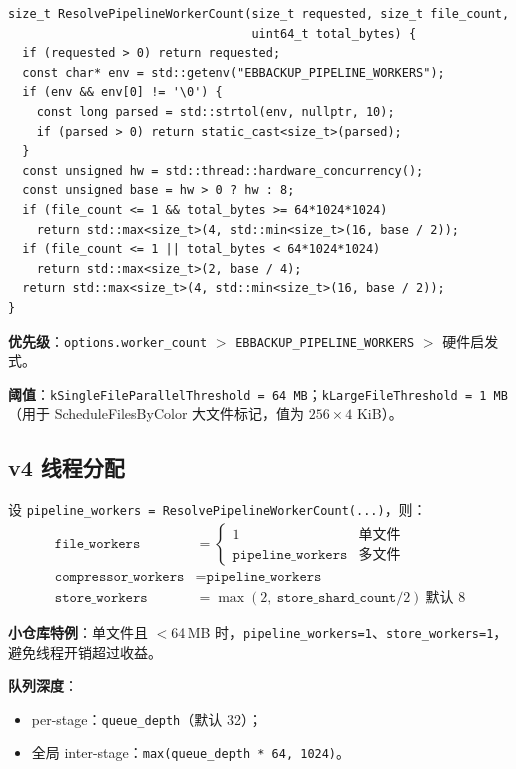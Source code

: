 \begin{lstlisting}[caption={ResolvePipelineWorkerCount 逻辑},label={lst:resolve-workers}]
size_t ResolvePipelineWorkerCount(size_t requested, size_t file_count,
                                  uint64_t total_bytes) {
  if (requested > 0) return requested;
  const char* env = std::getenv("EBBACKUP_PIPELINE_WORKERS");
  if (env && env[0] != '\0') {
    const long parsed = std::strtol(env, nullptr, 10);
    if (parsed > 0) return static_cast<size_t>(parsed);
  }
  const unsigned hw = std::thread::hardware_concurrency();
  const unsigned base = hw > 0 ? hw : 8;
  if (file_count <= 1 && total_bytes >= 64*1024*1024)
    return std::max<size_t>(4, std::min<size_t>(16, base / 2));
  if (file_count <= 1 || total_bytes < 64*1024*1024)
    return std::max<size_t>(2, base / 4);
  return std::max<size_t>(4, std::min<size_t>(16, base / 2));
}
\end{lstlisting}

\textbf{优先级}：\texttt{options.worker\_count} $>$ \texttt{EBBACKUP\_PIPELINE\_WORKERS} $>$ 硬件启发式。

\textbf{阈值}：\texttt{kSingleFileParallelThreshold = 64\,MB}；\texttt{kLargeFileThreshold = 1\,MB}（用于 ScheduleFilesByColor 大文件标记，值为 $256 \times 4$ KiB）。

\subsection{v4 线程分配}

设 \texttt{pipeline\_workers = ResolvePipelineWorkerCount(...)}，则：
\begin{align*}
\texttt{file\_workers} &= \begin{cases}
  1 & \text{单文件} \\
  \texttt{pipeline\_workers} & \text{多文件}
\end{cases} \\
\texttt{compressor\_workers} &= \texttt{pipeline\_workers} \\
\texttt{store\_workers} &= \max(2,\ \texttt{store\_shard\_count}/2)\ \text{默认 8}
\end{align*}

\textbf{小仓库特例}：单文件且 $<$64\,MB 时，\texttt{pipeline\_workers=1}、\texttt{store\_workers=1}，避免线程开销超过收益。

\textbf{队列深度}：
\begin{itemize}[nosep]
  \item per-stage：\texttt{queue\_depth}（默认 32）；
  \item 全局 inter-stage：\texttt{max(queue\_depth * 64, 1024)}。
\end{itemize}

